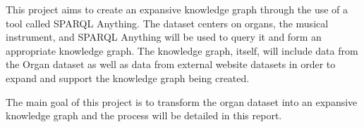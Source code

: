 This project aims to create an expansive knowledge graph through the use of a tool called SPARQL Anything. The dataset centers on organs, the musical instrument, and SPARQL  Anything will be used to query it and form an appropriate knowledge graph. The knowledge graph, itself, will include data from the Organ dataset as well as data from external website datasets in order to expand and support the knowledge graph being created. 

The main goal of this project is to transform the organ dataset into an expansive knowledge graph and the process will be detailed in this report. 

